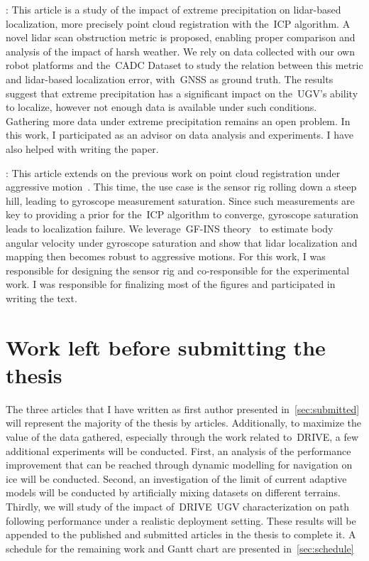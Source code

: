 \documentclass[12pt,letterpaper,oneside]{article}
\begin{document}
\textbf{}:
This article is a study of the impact of extreme precipitation on lidar-based localization, more precisely point cloud registration with the~\ac{ICP} algorithm.
A novel lidar scan obstruction metric is proposed, enabling proper comparison and analysis of the impact of harsh weather.
We rely on data collected with our own robot platforms and the~\ac{CADC} Dataset to study the relation between this metric and lidar-based localization error, with~\ac{GNSS} as ground truth.
The results suggest that extreme precipitation has a significant impact on the~\ac{UGV}'s ability to localize, however not enough data is available under such conditions.
Gathering more data under extreme precipitation remains an open problem.
In this work, I participated as an advisor on data analysis and experiments.
I have also helped with writing the paper.

\textbf{}: %
This article extends on the previous work on point cloud registration under aggressive motion~\citep{Deschenes2021}.
This time, the use case is the sensor rig rolling down a steep hill, leading to gyroscope measurement saturation.
Since such measurements are key to providing a prior for the~\ac{ICP} algorithm to converge, gyroscope saturation leads to localization failure.
We leverage~\ac{GF}-\ac{INS} theory~\citep{Pachter2013} to estimate body angular velocity under gyroscope saturation and show that lidar localization and mapping then becomes robust to aggressive motions.
For this work, I was responsible for designing the sensor rig and co-responsible for the experimental work.
I was responsible for finalizing most of the figures and participated in writing the text.

\section{Work left before submitting the thesis}
\label{sec:future_work}

The three articles that I have written as first author presented in~\autoref{sec:submitted} will represent the majority of the thesis by articles.
Additionally, to maximize the value of the data gathered, especially through the work related to~\ac{DRIVE}, a few additional experiments will be conducted.
First, an analysis of the performance improvement that can be reached through dynamic modelling for navigation on ice will be conducted.
Second, an investigation of the limit of current adaptive models will be conducted by artificially mixing datasets on different terrains.
Thirdly, we will study of the impact of~\ac{DRIVE}~\ac{UGV} characterization on path following performance under a realistic deployment setting.
These results will be appended to the published and submitted articles in the thesis to complete it.
A schedule for the remaining work and Gantt chart are presented in~\autoref{sec:schedule}
\end{document}
